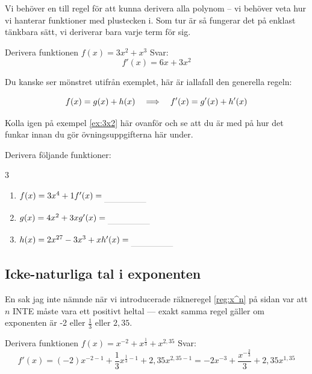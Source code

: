 \documentclass[a4paper, 12pt]{article}
\begin{document}
Vi behöver en till regel för att kunna derivera alla polynom -- vi behöver veta hur vi hanterar funktioner med plustecken i. Som tur är så fungerar det på enklast tänkbara sätt, vi deriverar bara varje term för sig.

\begin{exempel}
    \label{ex:3x2}
    Derivera funktionen $f(x) = 3x^2 + x^3$ \dinkus Svar: \[f'(x) = 6x + 3x^2\]
\end{exempel}

Du kanske ser mönstret utifrån exemplet, här är iallafall den generella regeln:

\begin{regel}
    \label{reg:sum}
    \[ f(x) = g(x) + h(x) \hspace{1em} \Longrightarrow \hspace{1em} f'(x) = g'(x) + h'(x) \] 
\end{regel}

Kolla igen på exempel \ref*{ex:3x2} här ovanför och se att du är med på hur det funkar innan du gör övningsuppgifterna här under.

\begin{uppgifter}
    \label{upp:f+g}
    Derivera följande funktioner:
    \begin{multicols}{3}
        \begin{enumerate}
            \item $f(x) = 3x^4 + 1 \\ f'(x) \ans$
            \item $g(x) = 4x^2 + 3x \\ g'(x) \ans$
            \item $h(x) = 2x^{27} - 3x^3 + x \\ h'(x) \ans$
        \end{enumerate}
    \end{multicols}
\end{uppgifter}

\subsection{Icke-naturliga tal i exponenten}
En sak jag inte nämnde när vi introducerade räkneregel \ref{reg:x^n} på sidan \pageref{reg:x^n} var att $n$ INTE måste vara ett positivt heltal --- exakt samma regel gäller om exponenten är -2 eller $\frac 13$ eller $2,35$.

\begin{exempel}
    \label{ex:x^1/3}
    Derivera funktionen $f(x) = x^{-2} + x^{\frac 13} + x^{2,35}$
    \dinkus
    Svar:
    \[ f'(x) = (-2)x^{-2-1} + \frac 13 x^{\frac 13 - 1} + 2,35 x^{2,35-1} = -2x^{-3} + \dfrac{x^{-\frac 23}}{3} + 2,35x^{1,35} \]
\end{exempel}
\end{document}
